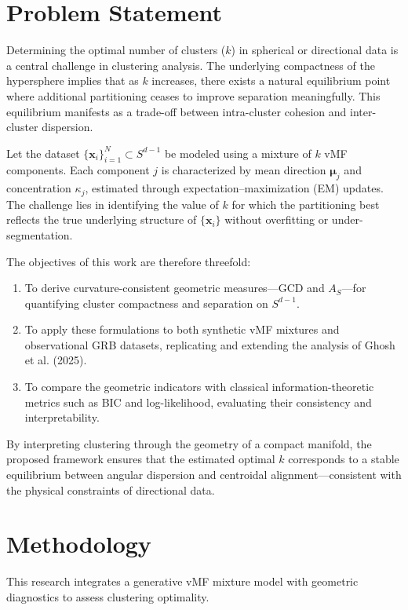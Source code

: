 \documentclass[12pt,a4paper]{report}
\begin{document}
\section{Problem Statement}
Determining the optimal number of clusters ($k$) in spherical or directional data is a central challenge in clustering analysis. The underlying compactness of the hypersphere implies that as $k$ increases, there exists a natural equilibrium point where additional partitioning ceases to improve separation meaningfully. This equilibrium manifests as a trade-off between intra-cluster cohesion and inter-cluster dispersion.

Let the dataset $\{\mathbf{x}_i\}_{i=1}^{N} \subset S^{d-1}$ be modeled using a mixture of $k$ vMF components. Each component $j$ is characterized by mean direction $\boldsymbol{\mu}_j$ and concentration $\kappa_j$, estimated through expectation–maximization (EM) updates. The challenge lies in identifying the value of $k$ for which the partitioning best reflects the true underlying structure of $\{\mathbf{x}_i\}$ without overfitting or under-segmentation.

The objectives of this work are therefore threefold:
\begin{enumerate}
    \item To derive curvature-consistent geometric measures—GCD and $A_S$—for quantifying cluster compactness and separation on $S^{d-1}$.
    \item To apply these formulations to both synthetic vMF mixtures and observational GRB datasets, replicating and extending the analysis of Ghosh et al. (2025).
    \item To compare the geometric indicators with classical information-theoretic metrics such as BIC and log-likelihood, evaluating their consistency and interpretability.
\end{enumerate}
By interpreting clustering through the geometry of a compact manifold, the proposed framework ensures that the estimated optimal $k$ corresponds to a stable equilibrium between angular dispersion and centroidal alignment—consistent with the physical constraints of directional data.

\section{Methodology}
This research integrates a generative vMF mixture model with geometric diagnostics to assess clustering optimality.
\end{document}
